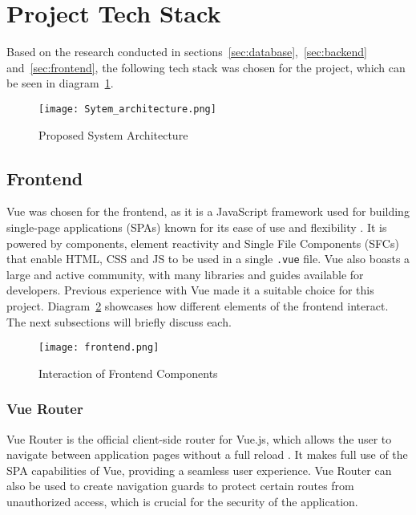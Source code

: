 \section{Project Tech Stack}\label{sec:techstack}

Based on the research conducted in sections~\ref{sec:database},~\ref{sec:backend} and~\ref{sec:frontend}, the following tech stack was chosen for the project, which can be seen in diagram~\ref{fig:architecture}.

\begin{figure}[htbp]
    \centering
    \texttt{[image: Sytem\_architecture.png]}
    \caption{Proposed System Architecture}\label{fig:architecture}
\end{figure}

\subsection{Frontend}

Vue was chosen for the frontend, as it is a JavaScript framework used for building single-page applications (SPAs) known for its ease of use and flexibility \parencite{vue}. It is powered by components, element reactivity and Single File Components (SFCs) that enable HTML, CSS and JS to be used in a single \lstinline{.vue} file. Vue also boasts a large and active community, with many libraries and guides available for developers. Previous experience with Vue made it a suitable choice for this project. Diagram~\ref{fig:frontend} showcases how different elements of the frontend interact. The next subsections will briefly discuss each.

\begin{figure}[htbp]
    \centering
    \texttt{[image: frontend.png]}
    \caption{Interaction of Frontend Components}\label{fig:frontend}
\end{figure}

\FloatBarrier{}
\subsubsection{Vue Router}

Vue Router is the official client-side router for Vue.js, which allows the user to navigate between application pages without a full reload \parencite{vuerouter}. It makes full use of the SPA capabilities of Vue, providing a seamless user experience. Vue Router can also be used to create navigation guards to protect certain routes from unauthorized access, which is crucial for the security of the application.

